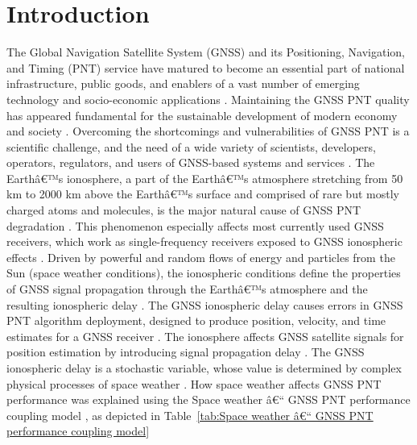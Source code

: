 \documentclass[sn-mathphys-num]{sn-jnl}%
\begin{document}



\maketitle

\section{Introduction}

The Global Navigation Satellite System (GNSS) and its Positioning, Navigation, and Timing (PNT) service have matured to become an essential part of national infrastructure, public goods, and enablers of a vast number of emerging technology and socio-economic applications \cite{filjar2022application}. Maintaining the GNSS PNT quality has appeared fundamental for the sustainable development of modern economy and society \cite{filjar2022application}. Overcoming the shortcomings and vulnerabilities of GNSS PNT is a scientific challenge, and the need of a wide variety of scientists, developers, operators, regulators, and users of GNSS-based systems and services \cite{filjar2024ambient, filjar2022application}. The Earthâ€™s ionosphere, a part of the Earthâ€™s atmosphere stretching from 50 km to 2000 km above the Earthâ€™s surface and comprised of rare but mostly charged atoms and molecules, is the major natural cause of GNSS PNT degradation \cite{davies1990ionospheric, filic2018modelling}. This phenomenon especially affects most currently used GNSS receivers, which work as single-frequency receivers exposed to GNSS ionospheric effects \cite{spilker1996global, filjar2022application}. Driven by powerful and random flows of energy and particles from the Sun (space weather conditions), the ionospheric conditions define the properties of GNSS signal propagation through the Earthâ€™s atmosphere and the resulting ionospheric delay \cite{davies1990ionospheric, oxley2017uncertainties, filic2018modelling}. The GNSS ionospheric delay causes errors in GNSS PNT algorithm deployment, designed to produce position, velocity, and time estimates for a GNSS receiver \cite{spilker1996global, filic2018modelling}. The ionosphere affects GNSS satellite signals for position estimation by introducing signal propagation delay \cite{spilker1996global, filic2018modelling}. The GNSS ionospheric delay is a stochastic variable, whose value is determined by complex physical processes of space weather \cite{filic2018modelling, filjar2022application}. How space weather affects GNSS PNT performance was explained using the Space weather â€“ GNSS PNT performance coupling model \cite{filic2018modelling}, as depicted in Table~\ref{tab:Space weather â€“ GNSS PNT performance coupling model}
\end{document}
